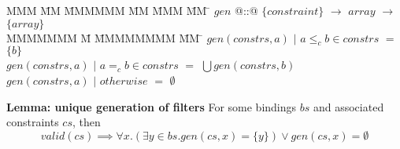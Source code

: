 \begin{tabbing}
MMM       \= MM \= MMMMMM \= MM \= MMM \= MM \= \kill
$gen$   \> @::@  \> $\{constraint\}$  \> $\to$ \> $array$ \> $\to$ \> $\{array\}$ \\
MMMMMMM                 \= M  \= MMMMMMMM \= MM \= \kill
$gen(constrs, a)$ \> $|$ \> $a \le_c b \in constrs$ \> $=$ \> $\{b\}$                        \\
$gen(constrs, a)$ \> $|$ \> $a =_c b \in constrs$   \> $=$ \> $\bigcup gen(constrs, b)$                        \\
$gen(constrs, a)$ \> $|$ \> $otherwise$             \> $=$ \> $\emptyset$                        \\
\end{tabbing}

\textbf{Lemma: unique generation of filters}
For some bindings $bs$ and associated constraints $cs$, then
\[
valid(cs) \implies \forall x. (\exists y \in bs. gen(cs, x) = \{y\}) \vee gen(cs, x) = \emptyset
\]

